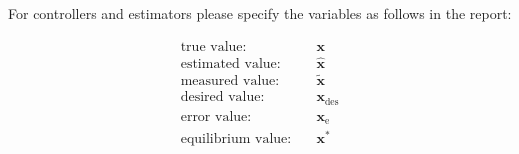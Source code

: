 For controllers and estimators please specify the variables as follows in the report:

	\[
		\begin{aligned}
			\text{true value:} \quad & \mathbf{x} \\
			\text{estimated value:} \quad & \hat{\mathbf{x}} \\
			\text{measured value:} \quad & \tilde{\mathbf{x}} \\
			\text{desired value:} \quad & \mathbf{x}_\text{des} \\
      \text{error value:} \quad & \mathbf{x}_\text{e} \\
      \text{equilibrium value:} \quad & \mathbf{x}^* \\
		\end{aligned}
	\]
